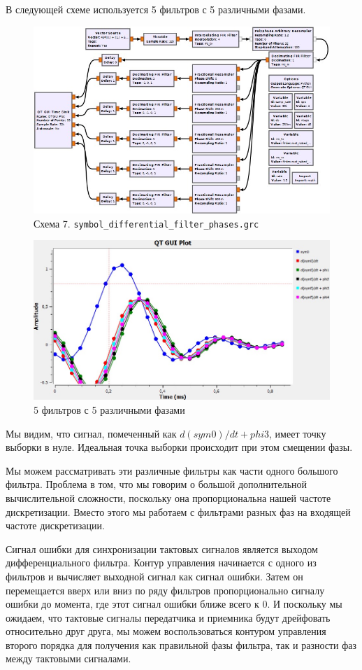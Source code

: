 \documentclass[a4paper, 12pt]{report}
\begin{document}
	В следующей схеме используется 5 фильтров с 5 различными фазами.
	\begin{figure}[H]
		\centering
		\includegraphics[width=1.0\textwidth]{17.jpg}
		\caption{Схема 7. \texttt{symbol\_differential\_filter\_phases.grc}}
		\label{fig:17}
	\end{figure}
	\begin{figure}[H]
		\centering
		\includegraphics[width=1.0\textwidth]{18.jpg}
		\caption{5 фильтров с 5 различными фазами}
		\label{fig:18}
	\end{figure}
	Мы видим, что сигнал, помеченный как $d(sym0)/dt + phi3$, имеет точку выборки в нуле. Идеальная точка выборки происходит при этом смещении фазы.

	Мы можем рассматривать эти различные фильтры как части одного большого фильтра. Проблема в том, что мы говорим о большой дополнительной вычислительной сложности, поскольку она пропорциональна нашей частоте дискретизации. Вместо этого мы работаем с фильтрами разных фаз на входящей частоте дискретизации.

	Сигнал ошибки для синхронизации тактовых сигналов является выходом дифференциального фильтра. Контур управления начинается с одного из фильтров и вычисляет выходной сигнал как сигнал ошибки. Затем он перемещается вверх или вниз по ряду фильтров пропорционально сигналу ошибки до момента, где этот сигнал ошибки ближе всего к 0. И поскольку мы ожидаем, что тактовые сигналы передатчика и приемника будут дрейфовать относительно друг друга, мы можем воспользоваться контуром управления второго порядка для получения как правильной фазы фильтра, так и разности фаз между тактовыми сигналами.
\end{document}

